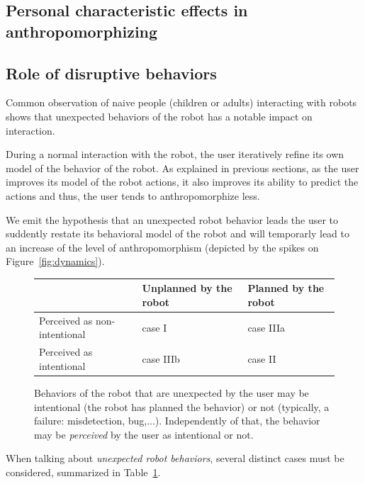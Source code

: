 \documentclass[twocolumn]{svjour3}          %
\begin{document}
\subsection{Personal characteristic effects in anthropomorphizing}
\label{sec:8.3}

\subsection{Role of disruptive behaviors}
\label{sec:disruptive}

Common observation of naive people (children or adults) interacting with robots
shows that unexpected behaviors of the robot has a notable impact on
interaction.

During a normal interaction with the robot, the user iteratively refine its own
model of the behavior of the robot. As explained in previous sections, as the
user improves its model of the robot actions, it also improves its ability to predict
the actions and thus, the user tends to anthropomorphize less.

We emit the hypothesis that an unexpected robot behavior leads the user to
suddently restate its behavioral model of the robot and will temporarly lead to
an increase of the level of anthropomorphism (depicted by the spikes on
Figure~\ref{fig:dynamics}).

\begin{figure}
\begin{center}
    \begin{tabular}{ | >{\centering\arraybackslash}m{1.5cm} | >{\centering\arraybackslash}m{2cm} | >{\centering\arraybackslash}m{2cm} |}
    \hline
     & Unplanned by the robot & Planned by the robot \\ \hline
    Perceived as non-intentional & case I  & case IIIa  \\ \hline
    Perceived as intentional &  case IIIb & case II  \\ \hline
    \end{tabular}
\end{center}
\caption{
    Behaviors of the robot that are unexpected by the user may be intentional
    (the robot has planned the behavior) or not (typically, a failure:
    misdetection, bug,...). Independently of that, the behavior may be
    \emph{perceived} by the user as intentional or not.}
\label{fig:perceptionUnexpectedBehavior}
\end{figure}

When talking about \emph{unexpected robot behaviors}, several distinct cases
must be considered, summarized in Table~\ref{fig:perceptionUnexpectedBehavior}.
\end{document}
